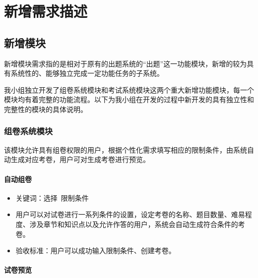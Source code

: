 \documentclass[hyperref, a4paper]{ctexart}
\providecommand{\tightlist}{%
  \setlength{\itemsep}{0pt}\setlength{\parskip}{0pt}}
\let\oldparagraph\paragraph
\renewcommand{\paragraph}[1]{\oldparagraph{#1}\mbox{}}
\begin{document}
\newpage

\tableofcontents

\newpage

\hypertarget{ux65b0ux589eux9700ux6c42ux63cfux8ff0}{%
\section{新增需求描述}\label{ux65b0ux589eux9700ux6c42ux63cfux8ff0}}

\hypertarget{ux65b0ux589eux6a21ux5757}{%
\subsection{新增模块}\label{ux65b0ux589eux6a21ux5757}}

新增模块需求指的是相对于原有的出题系统的``出题''这一功能模块，新增的较为具有系统性的、能够独立完成一定功能任务的子系统。

我小组独立开发了组卷系统模块和考试系统模块这两个重大新增功能模块，每一个模块均有着完整的功能流程。以下为我小组在开发的过程中新开发的具有独立性和完整性的模块的具体说明。

\hypertarget{ux7ec4ux5377ux7cfbux7edfux6a21ux5757}{%
\subsubsection{组卷系统模块}\label{ux7ec4ux5377ux7cfbux7edfux6a21ux5757}}

该模块允许具有组卷权限的用户，根据个性化需求填写相应的限制条件，由系统自动生成对应考卷，用户可对生成考卷进行预览。

\hypertarget{ux81eaux52a8ux7ec4ux5377}{%
\paragraph{自动组卷}\label{ux81eaux52a8ux7ec4ux5377}}

\begin{itemize}
\tightlist
\item
  关键词：选择~限制条件
\item
  用户可以对试卷进行一系列条件的设置，设定考卷的名称、题目数量、难易程度、涉及章节和知识点以及允许作答的用户，系统会自动生成符合条件的考卷。
\item
  验收标准：用户可以成功输入限制条件、创建考卷。
\end{itemize}

\hypertarget{ux8bd5ux5377ux9884ux89c8}{%
\paragraph{试卷预览}\label{ux8bd5ux5377ux9884ux89c8}}
\end{document}
